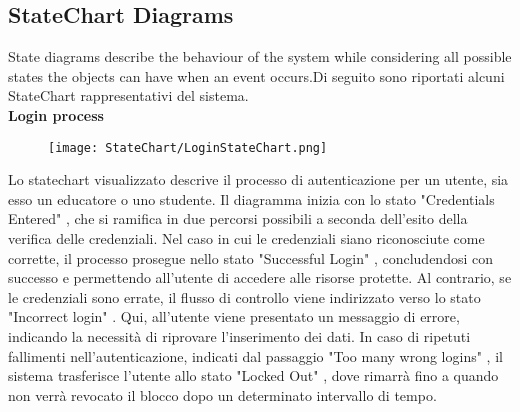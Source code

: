 \subsection{StateChart Diagrams}
State diagrams describe the behaviour of the system while considering all possible states the objects can have when an event occurs.Di seguito sono riportati alcuni StateChart rappresentativi del sistema.
\\

\noindent\textbf{Login process}
    \begin{figure}[H]
  \texttt{[image: StateChart/LoginStateChart.png]} 
  \label{fig:immagine}
\end{figure}
\noindent Lo statechart visualizzato descrive il processo di autenticazione per un utente, sia esso un educatore o uno studente. Il diagramma inizia con lo stato "Credentials Entered" , che si ramifica in due percorsi possibili a seconda dell'esito della verifica delle credenziali.
Nel caso in cui le credenziali siano riconosciute come corrette, il processo prosegue nello stato "Successful Login" , concludendosi con successo e permettendo all'utente di accedere alle risorse protette. Al contrario, se le credenziali sono errate, il flusso di controllo viene indirizzato verso lo stato "Incorrect login" . Qui, all'utente viene presentato un messaggio di errore, indicando la necessità di riprovare l'inserimento dei dati. In caso di ripetuti fallimenti nell'autenticazione, indicati dal passaggio "Too many wrong logins" , il sistema trasferisce l'utente allo stato "Locked Out" , dove rimarrà fino a quando non verrà revocato il blocco dopo un determinato intervallo di tempo. 


